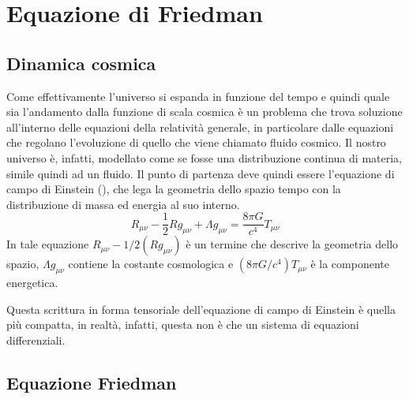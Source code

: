 \section{Equazione di Friedman}\label{sec:equazione-friedman}
\subsection{Dinamica cosmica}\label{sec:dinamica-cosmica}

Come effettivamente l'universo si espanda in funzione del tempo e quindi quale sia l'andamento dalla funzione di scala cosmica è un problema che trova soluzione all'interno delle equazioni della relatività generale, in particolare dalle equazioni che regolano l'evoluzione di quello che viene chiamato fluido cosmico. Il nostro universo è, infatti, modellato come se fosse una distribuzione continua di materia, simile quindi ad un fluido. Il punto di partenza deve quindi essere l'equazione di campo di Einstein (), che lega la geometria dello spazio tempo con la distribuzione di massa ed energia al suo interno.
\begin{equation}\label{eq:equazione-campo-einstein}
    R_{\mu \nu} -\frac{1}{2}R g_{\mu \nu} + \Lambda g_{\mu \nu} = \frac{8\pi G}{c^4}T_{\mu \nu}
\end{equation}
In tale equazione $R_{\mu \nu}-{1}/{2}(R g_{\mu \nu})$  è un termine che descrive la geometria dello spazio, $\Lambda g_{\mu \nu}$ contiene la costante cosmologica e $({8\pi G}/{c^4})T_{\mu \nu}$ è la componente energetica.

Questa scrittura in forma tensoriale dell'equazione di campo di Einstein è quella più compatta, in realtà, infatti, questa non è che un sistema di equazioni differenziali.
\subsection{Equazione Friedman}\label{sec:sub-equazione-friedman}

